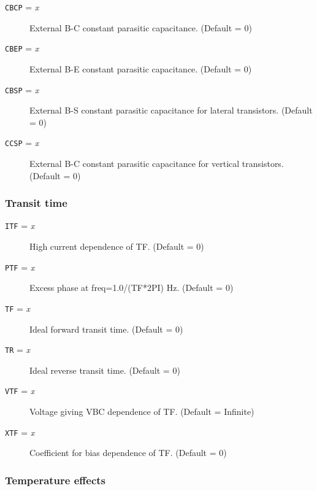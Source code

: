 \begin{description}

\item[{\tt CBCP} = {\it x}]
External B-C constant parasitic capacitance.  (Default = 0)

\item[{\tt CBEP} = {\it x}]
External B-E constant parasitic capacitance.  (Default = 0)

\item[{\tt CBSP} = {\it x}]
External B-S constant parasitic capacitance for lateral transistors.
(Default = 0)

\item[{\tt CCSP} = {\it x}]
External B-C constant parasitic capacitance for vertical transistors.
(Default = 0)

\end{description}

\subsubsection{Transit time}

\begin{description}

\item[{\tt ITF} = {\it x}]
High current dependence of TF.  (Default = 0)

\item[{\tt PTF} = {\it x}]
Excess phase at freq=1.0/(TF*2PI) Hz.  (Default = 0)

\item[{\tt TF} = {\it x}]
Ideal forward transit time.  (Default = 0)

\item[{\tt TR} = {\it x}]
Ideal reverse transit time.  (Default = 0)

\item[{\tt VTF} = {\it x}]
Voltage giving VBC dependence of TF.  (Default = Infinite)

\item[{\tt XTF} = {\it x}]
Coefficient for bias dependence of TF.  (Default = 0)

\end{description}

\subsubsection{Temperature effects}

